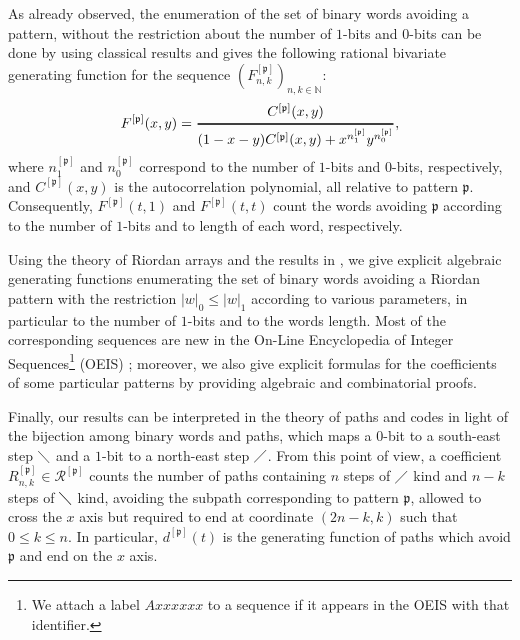 As already observed, the enumeration of the set of binary words avoiding a
pattern, without the restriction about the number of $1$-bits  and $0$-bits can be
done by using classical results and gives
the following rational bivariate generating function for the sequence
$(F_{n,k}^{[\mathfrak{p}]})_{n,k \in \mathbb{N}}:$ $$F^{[\mathfrak{p}]}(x,y)
=\genfrac{}{}{1pt}{0}{C^{[\mathfrak{p}]}(x,y)}{(1-x-y)C^{[\mathfrak{p}]}(x,y)
+x^{n_1^{[\mathfrak{p}]}}y^{n_0^{[\mathfrak{p}]}}},$$ where
$n_1^{[\mathfrak{p}]}$ and  $n_0^{[\mathfrak{p}]}$ correspond to the number of
$1$-bits  and $0$-bits, respectively, and $C^{[\mathfrak{p}]}(x,y)$ is the
autocorrelation polynomial, all relative to pattern $\mathfrak{p}$.
Consequently, $F^{[\mathfrak{p}]}(t,1)$ and $F^{[\mathfrak{p}]}(t,t)$ count the
words avoiding $\mathfrak{p}$ according to the number of $1$-bits  and to length
of each word, respectively.

Using the theory of Riordan arrays and the results in \citep{MERLINI20112988}, we give
explicit algebraic generating functions enumerating the set of binary words
avoiding a Riordan pattern with the restriction $|w|_0\leq |w|_1$ according to
various parameters, in particular to the number of $1$-bits  and to the words length.
Most of the corresponding sequences are new in the On-Line Encyclopedia of
Integer Sequences\footnote{We attach a label $Axxxxxx$ to a
sequence if it appears in the OEIS with that identifier.} (OEIS) \citep{OEIS};
moreover, we also give explicit formulas for the coefficients of some
particular patterns by providing algebraic and combinatorial proofs.

Finally, our results can be interpreted in the theory of paths and codes in
light of the bijection among binary words and paths, which maps a $0$-bit to a
south-east step $\diagdown$ and a $1$-bit  to a north-east step $\diagup$. From
this point of view, a coefficient $R_{n,k}^{[\mathfrak{p}]} \in
\mathcal{R}^{[\mathfrak{p}]}$ counts the number of paths containing $n$ steps
of $\diagup$ kind and $n-k$ steps of $\diagdown$ kind, avoiding the subpath
corresponding to pattern $\mathfrak{p}$, allowed to cross the $x$ axis but
required to end at coordinate $(2n-k, k)$ such that $0 \leq k \leq n$.
In particular, $d^{[\mathfrak{p}]}(t)$ is the generating function of paths which avoid
 $\mathfrak{p}$ and end on the $x$ axis.

